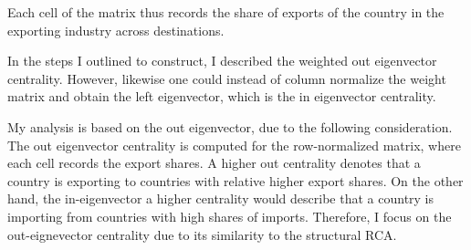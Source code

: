 Each cell of the matrix thus records the share of exports of the country in the exporting industry across destinations. \par
In the steps I outlined to construct, I described the weighted out eigenvector centrality.
However, likewise one could instead of column normalize the weight matrix and obtain the left eigenvector, which is the in eigenvector centrality.
 \par
My analysis is based on the out eigenvector, due to the following consideration.
The out eigenvector centrality is computed for the row-normalized matrix, where each cell records the export shares.
A higher out centrality denotes that a country is exporting to countries with relative higher export shares.
On the other hand, the in-eigenvector a higher centrality would describe that a country is importing from countries with high shares of imports.
Therefore, I focus on the  out-eignevector centrality due to its similarity to the structural RCA.


